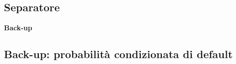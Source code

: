 \subsection{Separatore}%

\begin{frame}%


\vfill


\begin{center}
{\Huge \bfseries%
\color{lb}%
Back-up%
\color{black}%
}
\end{center}

\vfill
%

\transboxout
\end{frame}%




\subsection{Back-up: probabilit\`{a} condizionata di default}%

